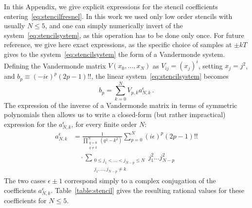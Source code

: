 \documentclass[aps,showpacs,twocolumn,
prd,superscriptaddress,nofootinbib]{revtex4-1}
\newcommand{\be}{\begin{equation}}
\newcommand{\ee}{\end{equation}}
\newcommand{\nn}{\nonumber}
\begin{document}
In this Appendix, we give explicit expressions for the stencil coefficients entering~\eqref{eq:stencilfresnel}. In this work we used only low order stencils with usually $N\leq 5$, and one can simply numerically invert of the system~\eqref{eq:stencilsystem}, as this operation has to be done only once. For future reference, we give here exact expressions, as the specific choice of samples at $\pm kT$ gives to the system~\eqref{eq:stencilsystem} the form of a Vandermonde system. Defining the Vandermonde matrix $V(x_{0},\dots,x_{N})$ as $V_{ij} = (x_{j})^{i}$, setting $x_{j} = j^{2}$, and $b_{p} \equiv (-i\epsilon)^{p}(2p-1)!!$, the linear system~\eqref{eq:stencilsystem} becomes
\be
	b_{p} = \sum\limits_{k=0}^{N} V_{p,k} a_{N,k}^{\epsilon} \,.
\ee
The expression of the inverse of a Vandermonde matrix in terms of symmetric polynomials then allows us to write a closed-form (but rather impractical) expression for the $a_{N,k}^{\epsilon}$, for every finite order $N$:
\begin{align}
	a_{N,k}^{\epsilon} &= \frac{1}{\prod\limits_{\substack{q=0 \\ q\neq k}}^{N} (q^{2}-k^{2})} \sum\limits_{p=0}^{N} (i\epsilon)^{p}(2p-1)!! \nn\\ & \quad \cdot \sum\limits_{\substack{ 0 \leq j_{1} < \dots < j_{N-p} \leq N \\ j_{1}, \dots, j_{N-p} \neq k}} j_{1}^{2}\dots j_{N-p}^{2}
\end{align}
The two cases $\epsilon\pm 1$ correspond simply to a complex conjugation of the coefficients $a_{N,k}^{\epsilon}$. Table~\ref{table:stencil} gives the resulting rational values for these coefficients for $N\leq 5$.



%

\end{document}
